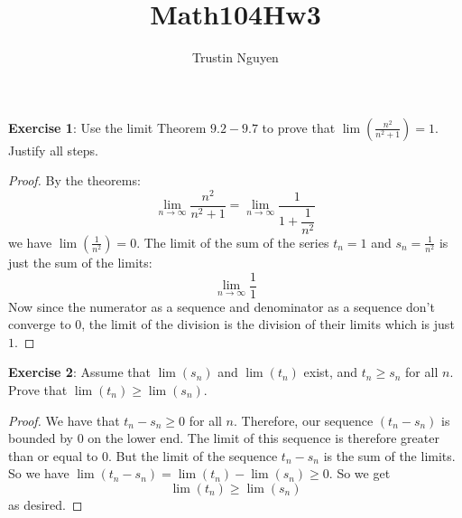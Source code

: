\documentclass{article}
\title{Math104Hw3}
\author{Trustin Nguyen}
\begin{document}
    \maketitle

\reversemarginpar

\textbf{Exercise 1}: Use the limit Theorem $9.2 - 9.7$ to prove that $\lim(\frac{n^{2}}{n^{2} + 1}) = 1$. Justify all steps.
    \begin{proof}
        By the theorems:
            \begin{equation*}
                \lim\limits_{n \to \infty} \dfrac{n^{2}}{n^{2} + 1} = \lim\limits_{n \to \infty} \dfrac{1}{1 + \dfrac{1}{n^{2}}}
            \end{equation*}
        we have $\lim(\frac{1}{n^{2}}) = 0$. The limit of the sum of the series $t_{n} = 1$ and $s_{n} = \frac{1}{n^{2}}$ is just the sum of the limits:
            \begin{equation*}
                \lim\limits_{n \to \infty} \dfrac{1}{1}
            \end{equation*}
        Now since the numerator as a sequence and denominator as a sequence don't converge to $0$, the limit of the division is the division of their limits which is just $1$.
    \end{proof}


\textbf{Exercise 2}: Assume that $\lim(s_{n})$ and $\lim(t_{n})$ exist, and $t_{n} \geq s_{n}$ for all $n$. Prove that $\lim(t_{n}) \geq \lim(s_{n})$.
    \begin{proof}
        We have that $t_{n} - s_{n} \geq 0$ for all $n$. Therefore, our sequence $(t_{n} - s_{n})$ is bounded by $0$ on the lower end. The limit of this sequence is therefore greater than or equal to $0$. But the limit of the sequence $t_{n} - s_{n}$ is the sum of the limits. So we have $\lim(t_{n} - s_{n}) = \lim(t_{n}) - \lim(s_{n}) \geq 0$. So we get
            \begin{equation*}
                \lim(t_{n}) \geq \lim(s_{n})
            \end{equation*}
        as desired.
    \end{proof}
\end{document}
